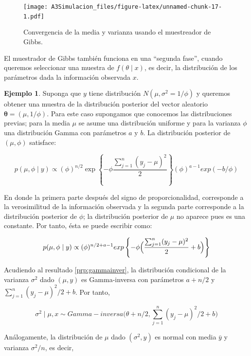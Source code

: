 \documentclass[
  10pt,
  spanish,
]{book}
\theoremstyle{definition}
\theoremstyle{definition}
\newtheorem{example}{Ejemplo}[chapter]
\theoremstyle{definition}
\theoremstyle{definition}
\theoremstyle{remark}
\begin{document}
\begin{figure}
\centering
\texttt{[image: A3Simulacion\_files/figure-latex/unnamed-chunk-17-1.pdf]}
\caption{\label{fig:unnamed-chunk-17}Convergencia de la media y varianza usando el muestreador de Gibbs.}
\end{figure}

El muestrador de Gibbs también funciona en una ``segunda fase'', cuando queremos seleccionar una muestra de \(f(\theta\mid x)\), es decir, la distribución de los parámetros dada la información observada \(x\).

\begin{example}
\protect\hypertarget{exm:GibbsN2}{}{\label{exm:GibbsN2} }Suponga que \(y\) tiene distribución \(N(\mu,\sigma^2=1/\phi)\) y queremos obtener una muestra de la distribución posterior del vector aleatorio \(\boldsymbol \theta=(\mu,1/\phi)\). Para este caso supongamos que conocemos las distribuciones previas; para la media \(\mu\) se asume una distribución uniforme y para la varianza \(\phi\) una distribución Gamma con parámetros \(a\) y \(b\). La distribución posterior de \((\mu, \phi)\) satisface:

\begin{equation}  
p(\mu, \phi \mid y) \propto (\phi)^{n/2}
\exp\left\{-\phi
\frac{\sum_{j=1}^n(y_j-\mu)^2}{2}\right\}(\phi)^{a-1}exp(-b/\phi)
\end{equation}

En donde la primera parte después del signo de proporcionalidad, corresponde a la verosimilitud de la información observada y la segunda parte corresponde a la distribución posterior de \(\phi\); la distribución posterior de \(\mu\) no
aparece pues es una constante. Por tanto, ésta se puede escribir como:

\begin{equation*}  
p(\mu, \phi \mid y)\propto(\phi)^{n/2+a-1}exp\left\{-\phi\Bigl(\frac{\sum_{j=1}^n(y_j-\mu)^2}{2}+b\Bigl)\right\}
\end{equation*}

Acudiendo al resultado \ref{prp:gammainver}, la distribución condicional de la varianza \(\sigma^2\) dado \((\mu, y)\) es Gamma-inversa con parámetros \(a+n/2\) y \(\sum_{j=1}^n(y_j-\mu)^2/2+b\). Por tanto,

\begin{equation} 
\label{eq:apmunormal}
\sigma^2\mid\mu,x\sim Gamma-inversa\biggl(\theta+n/2,\sum_{j=1}^n(y_j-\mu)^2/2+b\biggl)
\end{equation}

Análogamente, la distribución de \(\mu\) dado \((\sigma^2, y)\) es normal
con media \(\bar{y}\) y varianza \(\sigma^2/n\), es decir,


\end{example}
\end{document}
